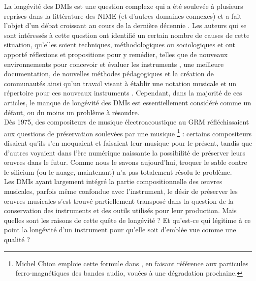 \noindent La longévité des \glspl{DMI} est une question complexe qui a été soulevée à plusieurs reprises dans la littérature des \gls{NIME} (et d'autres domaines connexes) et a fait l'objet d'un débat croissant au cours de la dernière décennie \cite{baguyos_contemporary_2014, morreale_design_2017,bonardi_preservation_2008}. Les auteurs qui se sont intéressés à cette question ont identifié un certain nombre de causes de cette situation, qu'elles soient techniques, méthodologiques ou sociologiques et ont apporté réflexions et propositions pour y remédier, telles que de nouveaux environnements pour concevoir et évaluer les instruments \cite{jorda_digital_2004, morreale_design_2017}, une meilleure documentation, de nouvelles méthodes pédagogiques et la création de communautés ainsi qu'un travail visant à établir une notation musicale et un répertoire pour ces nouveaux instruments \cite{mamedes_composing_2014,mays_notation_2014}. Cependant, dans la majorité de ces articles, le manque de longévité des \glspl{DMI} est essentiellement considéré comme un défaut, ou du moins un problème à résoudre.\\
\indent Dès 1975, des compositeurs de musique électroacoustique au \gls{GRM} réfléchissaient aux questions de préservation soulevées par une musique  \footnote{Michel Chion emploie cette formule dans \cite{chion_musique_1977}, en faisant référence aux particules ferro-magnétiques des bandes audio, vouées à une dégradation prochaine.} : certains compositeurs disaient qu'ils s'en moquaient et faisaient leur musique pour le présent, tandis que d'autres voyaient dans l'ère numérique naissante la possibilité de préserver leurs œuvres dans le futur. Comme nous le savons aujourd'hui, troquer le sable contre le silicium (ou le nuage, maintenant) n'a pas totalement résolu le problème.\\
\indent Les \glspl{DMI} ayant largement intégré la partie compositionnelle des œuvres musicales, parfois même confondue avec l'instrument, le désir de préserver les œuvres musicales s'est trouvé partiellement transposé dans la question de la conservation des instruments et des outils utilisés pour leur production. Mais quelles sont les raisons de cette quête de longévité ? Et qu’est-ce qui légitime à ce point la longévité d’un instrument pour qu’elle soit d’emblée vue comme une qualité ? 

